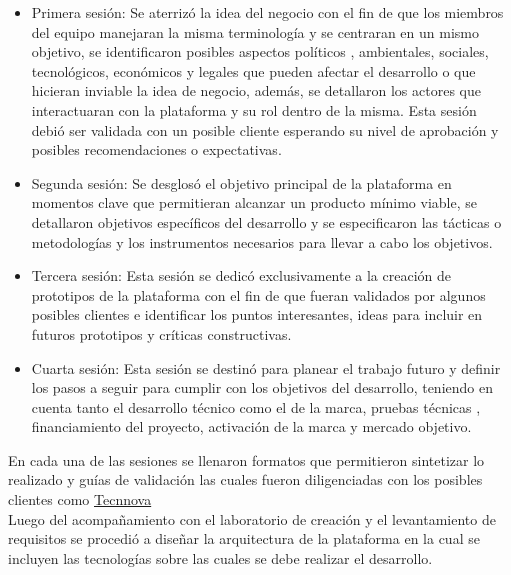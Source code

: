 \begin{itemize}
    \item Primera sesión: Se aterrizó la idea del negocio con el fin de que los miembros del equipo manejaran la misma terminología y se centraran en un mismo objetivo, se identificaron posibles aspectos políticos , ambientales, sociales, tecnológicos, económicos y legales que pueden afectar el desarrollo o que hicieran inviable la idea de negocio, además, se detallaron los actores que interactuaran con la plataforma y su rol dentro de la misma. Esta sesión debió ser validada con un posible cliente esperando su nivel de aprobación y posibles recomendaciones o expectativas.
    \item  Segunda sesión: Se desglosó el objetivo principal de la plataforma en momentos clave que permitieran alcanzar un producto mínimo viable, se detallaron objetivos específicos del desarrollo y se especificaron las tácticas o metodologías y los instrumentos necesarios para llevar a cabo los objetivos. 
    \item Tercera sesión: Esta sesión se dedicó exclusivamente a la creación de prototipos de la plataforma con el fin de que fueran validados por algunos posibles clientes e identificar los puntos interesantes, ideas para incluir en futuros prototipos y críticas constructivas.
    \item Cuarta sesión: Esta sesión se destinó para planear el trabajo futuro y definir los pasos a seguir para cumplir con los objetivos del desarrollo, teniendo en cuenta tanto el desarrollo técnico como el de la marca, pruebas técnicas , financiamiento del proyecto, activación de la marca y mercado objetivo.
\end{itemize}

En cada una de las sesiones se llenaron formatos que permitieron sintetizar lo realizado y guías de validación las cuales fueron diligenciadas con los posibles clientes como \href{http://www.tecnnova.org/}{Tecnnova} \\

Luego del acompañamiento con el laboratorio de creación y el levantamiento de requisitos se procedió a diseñar la arquitectura de la plataforma en la cual se incluyen las tecnologías sobre las cuales se debe realizar el desarrollo.